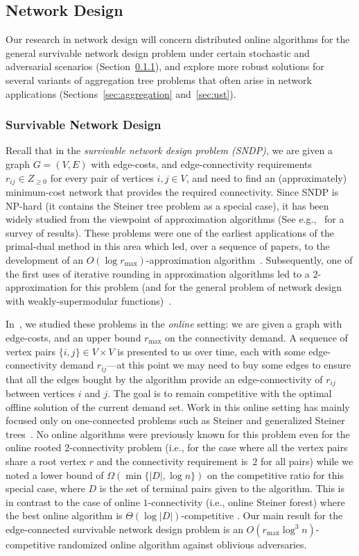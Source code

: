 \subsection{Network Design}
Our research in network design will concern distributed online
algorithms for the general survivable network design problem under
certain stochastic and adversarial scenarios (Section~\ref{sec:sndp}),
and explore more robust solutions for several variants of aggregation
tree problems that often arise in network applications
(Sections~\ref{sec:aggregation} and~\ref{sec:ust}).

\subsubsection{Survivable Network Design}
\label{sec:sndp}
Recall that in the {\em survivable network design problem (SNDP)}, we
are given a graph $G = (V,E)$ with edge-costs, and edge-connectivity
requirements $r_{ij} \in Z_{\ge 0}$ for every pair of vertices $i, j
\in V$, and need to find an (approximately) minimum-cost network that
provides the required connectivity.  Since SNDP is NP-hard (it
contains the Steiner tree problem as a special case), it has been
widely studied from the viewpoint of approximation algorithms (See
e.g.,~\cite{GK11} for a survey of results). These problems were one of
the earliest applications of the primal-dual method in this area which
led, over a sequence of papers, to the development of an $O(\log
r_{\max})$-approximation algorithm~\cite{GGPSTW94}.  Subsequently, one
of the first uses of iterative rounding in approximation algorithms
led to a $2$-approximation for this problem (and for the general
problem of network design with weakly-supermodular
functions)~\cite{Jain01}.

In~\cite{gkr10}, we studied these problems in the
\emph{online} setting: we are given a graph with edge-costs, and an
upper bound $r_{\max}$ on the connectivity demand. A sequence of vertex pairs $\{i,j\} \in V
\times V$ is presented to us over time, each with some edge-connectivity
demand $r_{ij}$---at this point we may need to buy some edges to ensure
that all the edges bought by the algorithm provide
an edge-connectivity of  $r_{ij}$ between vertices $i$ and $j$.  The goal is to remain
competitive with the optimal offline solution of the current demand set.
Work in this online
setting has mainly focused only on one-connected problems such as
Steiner and generalized Steiner trees~\cite{qw11}.
No online algorithms were previously known
for this problem even for the online rooted $2$-connectivity problem (i.e., for
the case where all the vertex pairs share a root vertex $r$ and the
connectivity requirement is~$2$ for all pairs) while we noted
a lower bound of $\Omega(\min\{|D|, \log n\})$ on the competitive ratio for this special case, where $D$ is the set of terminal pairs given to the
algorithm. This is in contrast to the case of online $1$-connectivity (i.e., online Steiner forest) where the best online algorithm is $\Theta(\log |D|)$-competitive \cite{BCsteiner97}.
Our main result for the edge-connected survivable network design problem is an $O(r_{\max} \log^3 n)$-competitive randomized online algorithm against oblivious adversaries.

